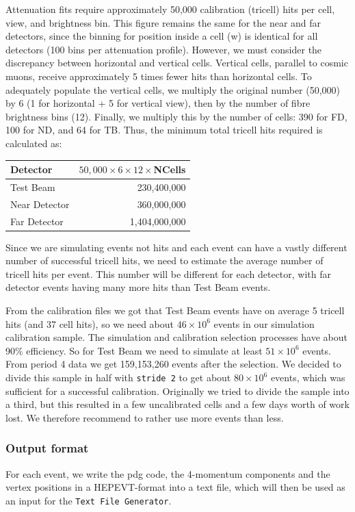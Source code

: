 \documentclass[12pt]{article}
\begin{document}
Attenuation fits require approximately 50,000 calibration (tricell) hits per cell, view, and brightness bin. This figure remains the same for the near and far detectors, since the binning for position inside a cell (w) is identical for all detectors (100 bins per attenuation profile). However, we must consider the discrepancy between horizontal and vertical cells. Vertical cells, parallel to cosmic muons, receive approximately 5 times fewer hits than horizontal cells. To adequately populate the vertical cells, we multiply the original number (50,000) by 6 (1 for horizontal + 5 for vertical view), then by the number of fibre brightness bins (12). Finally, we multiply this by the number of cells: 390 for FD, 100 for ND, and 64 for TB. Thus, the minimum total tricell hits required is calculated as:
\begin{center}
\begin{tabular}{lr}
Detector & $50,000\times 6\times 12\times$NCells\\\hline
Test Beam & 230,400,000\\
Near Detector & 360,000,000\\
Far Detector & 1,404,000,000
\end{tabular}
\end{center}

Since we are simulating events not hits and each event can have a vastly different number of successful tricell hits, we need to estimate the average number of tricell hits per event. This number will be different for each detector, with far detector events having many more hits than Test Beam events.

From the calibration files we got that Test Beam events have on average 5 tricell hits (and 37 cell hits), so we need about $46\times10^6$ events in our simulation calibration sample. The simulation and calibration selection processes have about 90\% efficiency. So for Test Beam we need to simulate at least $51\times10^6$ events. From period 4 data we get 159,153,260 events after the selection. We decided to divide this sample in half with \texttt{stride 2} to get about $80\times10^6$ events, which was sufficient for a successful calibration. Originally we tried to divide the sample into a third, but this resulted in a few uncalibrated cells and a few days worth of work lost. We therefore recommend to rather use more events than less.

\subsubsection{Output format}\label{secHEPEVTFormat}
For each event, we write the pdg code, the 4-momentum components and the vertex positions in a HEPEVT-format \cite{HEPEVTFormat} into a text file, which will then be used as an input for the \texttt{Text File Generator}.
\end{document}

